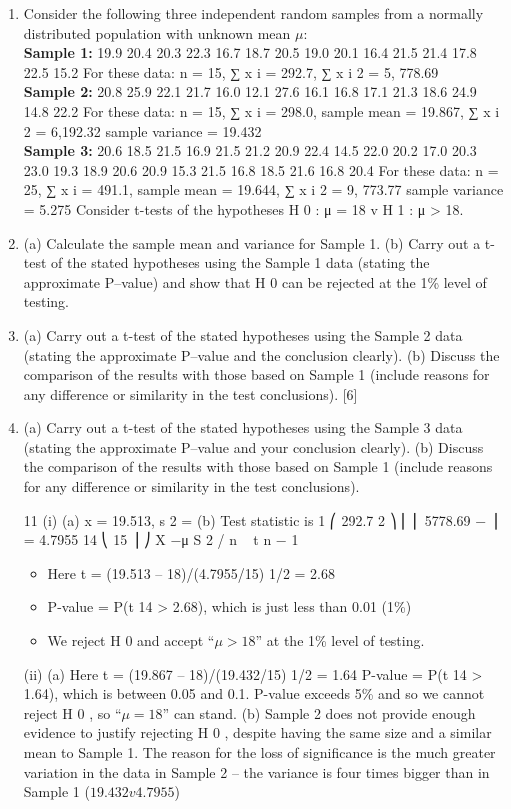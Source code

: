 \documentclass[a4paper,12pt]{article}
\begin{document}
\begin{enumerate}
\item %
Consider the following three independent random samples from a normally distributed population with unknown mean $\mu$:
\\
\noindent \textbf{Sample 1:}
19.9 20.4 20.3 22.3 16.7 18.7 20.5 19.0 20.1 16.4 21.5 21.4 17.8 22.5 15.2
For these data: n = 15,
∑ x i = 292.7,
∑ x i 2 = 5, 778.69
\\
\noindent \textbf{Sample 2:}
20.8 25.9 22.1 21.7 16.0 12.1 27.6 16.1 16.8 17.1 21.3 18.6 24.9 14.8 22.2
For these data: n = 15,
∑ x i = 298.0,
sample mean = 19.867,
∑ x i 2 = 6,192.32
sample variance = 19.432
\\
\noindent \textbf{Sample 3:}
20.6 18.5 21.5 16.9 21.5 21.2 20.9 22.4 14.5 22.0 20.2 17.0 20.3 23.0 19.3
18.9 20.6 20.9 15.3 21.5 16.8 18.5 21.6 16.8 20.4
For these data: n = 25, ∑ x i = 491.1,
sample mean = 19.644,
∑ x i 2 = 9, 773.77
sample variance = 5.275
Consider t-tests of the hypotheses H 0 : μ = 18 v H 1 : μ > 18.
\item 

(a) Calculate the sample mean and variance for Sample 1.
(b) Carry out a t-test of the stated hypotheses using the Sample 1 data (stating the approximate P–value) and show that H 0 can be rejected at the 1\% level of testing.
\item 
(a) Carry out a t-test of the stated hypotheses using the Sample 2 data (stating the approximate P–value and the conclusion clearly).
(b) Discuss the comparison of the results with those based on Sample 1 (include reasons for any difference or similarity in the test
conclusions).
[6]
\item 
(a) Carry out a t-test of the stated hypotheses using the Sample 3 data (stating the approximate P–value and your conclusion clearly).
(b) Discuss the comparison of the results with those based on Sample 1 (include reasons for any difference or similarity in the test
conclusions).

\newpage

11
(i)
(a) x = 19.513, s 2 =
(b) Test statistic is
1 ⎛
292.7 2 ⎞
⎜ ⎜ 5778.69 −
⎟ = 4.7955
14 ⎝
15 ⎟ ⎠
X −μ
S 2 / n
~ t n − 1
\begin{itemize}
\item Here t = (19.513 – 18)/(4.7955/15) 1/2 = 2.68
\item P-value = P(t 14 > 2.68), which is just less than 0.01 (1\%)
\item We reject H 0 and accept “$\mu > 18$” at the 1\% level of testing.
\end{itemize}
(ii)
(a)
Here t = (19.867 – 18)/(19.432/15) 1/2 = 1.64
P-value = P(t 14 > 1.64), which is between 0.05 and 0.1.
P-value exceeds 5\% and so we cannot reject H 0 , so “$\mu = 18$” can stand.
(b)
Sample 2 does not provide enough evidence to justify rejecting H 0 , despite having the same size and a similar mean to Sample 1.
The reason for the loss of significance is the much greater variation in the data in Sample 2 – the variance is four times bigger than in Sample 1 ($19.432 v 4.7955$)


\end{enumerate}
\end{document}
